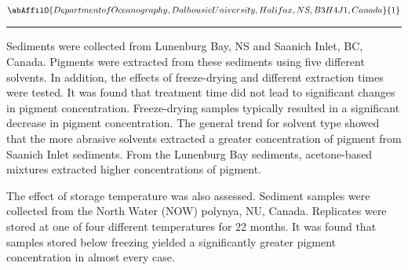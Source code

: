 \begin{minipage}{\linewidth}\begin{center}\begin{minipage}{\linewidth}
   \vspace{2 mm} \begin{center}
    \vspace{2 mm}\begin{center}
  
  $\abAffilO{Department of Oceanography, Dalhousie University, Halifax, NS, B3H 4J1, Canada}{1}$

  \end{center}
  \vspace{2 mm}
  \end{center}\end{minipage}\end{center}
  \begin{center}\rule{0.70\linewidth}{0.5 pt}\end{center}
  \begin{minipage}{\linewidth}
\noindent Sediments were collected from Lunenburg Bay, NS and Saanich Inlet, BC, Canada. Pigments were extracted from these sediments using five different solvents. In addition, the effects of freeze-drying and different extraction times were tested. It was found that treatment time did not lead to significant changes in pigment concentration. Freeze-drying samples typically resulted in a significant decrease in pigment concentration. The general trend for solvent type showed that the more abrasive solvents extracted a greater concentration of pigment from Saanich Inlet sediments. From the Lunenburg Bay sediments, acetone-based mixtures extracted higher concentrations of pigment.

The effect of storage temperature was also assessed. Sediment samples were collected from the North Water (NOW) polynya, NU, Canada. Replicates were stored at one of four different temperatures for 22 months. It was found that samples stored below freezing yielded a significantly greater pigment concentration in almost every case.
\end{minipage}\end{minipage}
